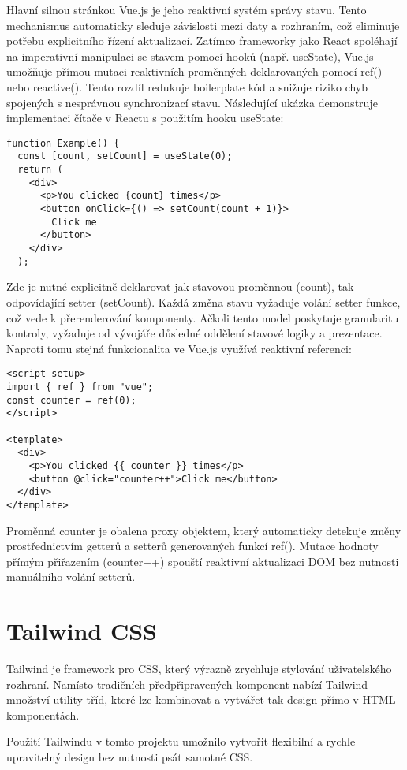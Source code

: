 Hlavní silnou stránkou Vue.js je jeho reaktivní systém správy stavu. Tento mechanismus automaticky sleduje závislosti mezi daty a rozhraním, což eliminuje potřebu explicitního řízení aktualizací\cite{vuejsVuejsDocs}.
Zatímco frameworky jako React spoléhají na imperativní manipulaci se stavem pomocí hooků (např. useState), Vue.js umožňuje přímou mutaci reaktivních proměnných deklarovaných pomocí ref() nebo reactive(). Tento rozdíl redukuje boilerplate kód a snižuje riziko chyb spojených s nesprávnou synchronizací stavu. Následující ukázka demonstruje implementaci čítače v Reactu s použitím hooku useState:
\begin{lstlisting}
function Example() {
  const [count, setCount] = useState(0);
  return (
    <div>
      <p>You clicked {count} times</p>
      <button onClick={() => setCount(count + 1)}>
        Click me
      </button>
    </div>
  );
\end{lstlisting}
Zde je nutné explicitně deklarovat jak stavovou proměnnou (count), tak odpovídající setter (setCount). Každá změna stavu vyžaduje volání setter funkce, což vede k přerenderování komponenty. Ačkoli tento model poskytuje granularitu kontroly, vyžaduje od vývojáře důsledné oddělení stavové logiky a prezentace. Naproti tomu stejná funkcionalita ve Vue.js využívá reaktivní referenci:
\begin{lstlisting}
<script setup>
import { ref } from "vue";
const counter = ref(0);
</script>

<template>
  <div>
    <p>You clicked {{ counter }} times</p>
    <button @click="counter++">Click me</button>
  </div>
</template>
\end{lstlisting}
Proměnná counter je obalena proxy objektem, který automaticky detekuje změny prostřednictvím getterů a setterů generovaných funkcí ref(). Mutace hodnoty přímým přiřazením (counter++) spouští reaktivní aktualizaci DOM bez nutnosti manuálního volání setterů.

\section{Tailwind CSS}
Tailwind je framework pro CSS, který výrazně zrychluje stylování uživatelského rozhraní. Namísto tradičních předpřipravených komponent nabízí Tailwind množství utility tříd, které lze kombinovat a vytvářet tak design přímo v HTML komponentách.

Použití Tailwindu v tomto projektu umožnilo vytvořit flexibilní a rychle upravitelný design bez nutnosti psát samotné CSS.

